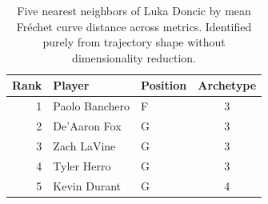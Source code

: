 \begin{table}[htbp]
  \centering\small
  \begin{tabular}{rllc}
    \toprule
    Rank & Player & Position & Archetype \\
    \midrule
    1 & Paolo Banchero & F & 3 \\
    2 & De'Aaron Fox & G & 3 \\
    3 & Zach LaVine & G & 3 \\
    4 & Tyler Herro & G & 3 \\
    5 & Kevin Durant & G & 4 \\
    \bottomrule
  \end{tabular}
  \caption{Five nearest neighbors of Luka Doncic by mean Fr\'{e}chet curve distance across metrics. Identified purely from trajectory shape without dimensionality reduction.}
  \label{tab:Luka_Doncic_frechet_curve_neighbors}
\end{table}

